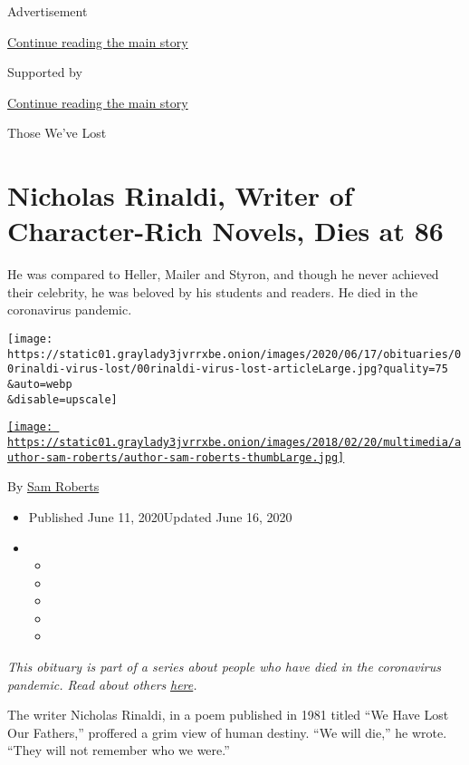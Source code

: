 Advertisement

\protect\hyperlink{after-top}{Continue reading the main story}

Supported by

\protect\hyperlink{after-sponsor}{Continue reading the main story}

Those We've Lost

\hypertarget{nicholas-rinaldi-writer-of-character-rich-novels-dies-at-86}{%
\section{Nicholas Rinaldi, Writer of Character-Rich Novels, Dies at
86}\label{nicholas-rinaldi-writer-of-character-rich-novels-dies-at-86}}

He was compared to Heller, Mailer and Styron, and though he never
achieved their celebrity, he was beloved by his students and readers. He
died in the coronavirus pandemic.

\texttt{[image: https://static01.graylady3jvrrxbe.onion/images/2020/06/17/obituaries/00rinaldi-virus-lost/00rinaldi-virus-lost-articleLarge.jpg?quality=75\\\&auto=webp\\\&disable=upscale]}

\href{https://www.nytimes3xbfgragh.onion/by/sam-roberts}{\texttt{[image: https://static01.graylady3jvrrxbe.onion/images/2018/02/20/multimedia/author-sam-roberts/author-sam-roberts-thumbLarge.jpg]}}

By \href{https://www.nytimes3xbfgragh.onion/by/sam-roberts}{Sam Roberts}

\begin{itemize}
\item
  Published June 11, 2020Updated June 16, 2020
\item
  \begin{itemize}
  \item
  \item
  \item
  \item
  \item
  \end{itemize}
\end{itemize}

\emph{This obituary is part of a series about people who have died in
the coronavirus pandemic. Read about others}
\href{https://www.nytimes3xbfgragh.onion/interactive/2020/obituaries/people-died-coronavirus-obituaries.html}{\emph{here}}\emph{.}

The writer Nicholas Rinaldi, in a poem published in 1981 titled ``We
Have Lost Our Fathers,'' proffered a grim view of human destiny. ``We
will die,'' he wrote. ``They will not remember who we were.''

